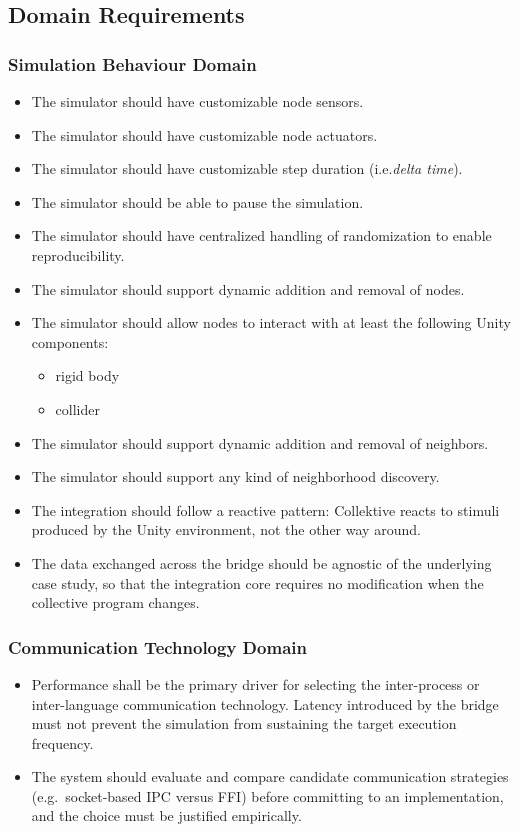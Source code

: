 \subsection{Domain Requirements}

\subsubsection{Simulation Behaviour Domain}

\begin{itemize}
    \item The simulator should have customizable node sensors.
    \item The simulator should have customizable node actuators.
    \item The simulator should have customizable step duration (i.e.\emph{delta time}).
    \item The simulator should be able to pause the simulation.
    \item The simulator should have centralized handling of randomization to enable reproducibility.
    \item The simulator should support dynamic addition and removal of nodes.
    \item The simulator should allow nodes to interact with at least the following Unity components:
          \begin{itemize}
              \item rigid body
              \item collider
          \end{itemize}
    \item The simulator should support dynamic addition and removal of neighbors.
    \item The simulator should support any kind of neighborhood discovery.
    \item The integration should follow a reactive pattern: Collektive reacts to stimuli produced by the Unity environment, not the other way around.
    \item The data exchanged across the bridge should be agnostic of the underlying case study, so that the integration core requires no modification when the collective program changes.
\end{itemize}

\subsubsection{Communication Technology Domain}
\begin{itemize}
    \item Performance shall be the primary driver for selecting the inter-process or inter-language communication technology. Latency introduced by the bridge must not prevent the simulation from sustaining the target execution frequency.
    \item The system should evaluate and compare candidate communication strategies (e.g.\ socket-based \ac{IPC} versus \ac{FFI}) before committing to an implementation, and the choice must be justified empirically.
\end{itemize}

